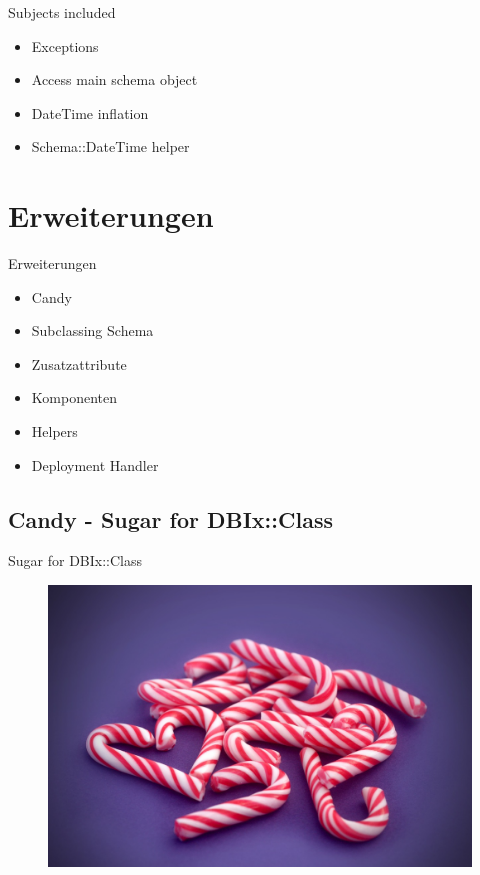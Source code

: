 \begin{frame}[fragile]{Subjects included}
\begin{itemize}
\item Exceptions
\item Access main schema object
\item DateTime inflation
\item Schema::DateTime helper
\end{itemize}
\end{frame}

\section{Erweiterungen}

\begin{frame}{Erweiterungen}
\begin{itemize}
\item Candy
\item Subclassing Schema
\item Zusatzattribute
\item Komponenten
\item Helpers
\item Deployment Handler
\end{itemize}
\end{frame}

\subsection{Candy - Sugar for DBIx::Class}

\begin{frame}{Sugar for DBIx::Class}
\begin{figure}[!ht]
\centering
\includegraphics[width=0.8\linewidth]{img/candy-cane.jpg}
\end{figure}
\end{frame}

